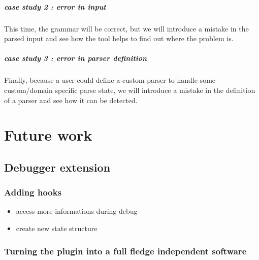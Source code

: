 	\paragraph{case study 2 : error in input}

	This time, the grammar will be correct, but we will introduce a mistake in the parsed input and see how the tool helps to find out where the problem is.

	\paragraph{case study 3 : error in parser definition}

	Finally, because a user could define a custom parser to handle some custom/domain specific parse state, we will introduce a mistake in the definition of a parser and see how it can be detected.


%
\chapter{Future work}
%

	\section{Debugger extension}

	\subsection{Adding hooks}
	\begin{itemize}
		\item access more informations during debug
		\item create new state structure
	\end{itemize}

	\subsection{Turning the plugin into a full fledge independent software}

